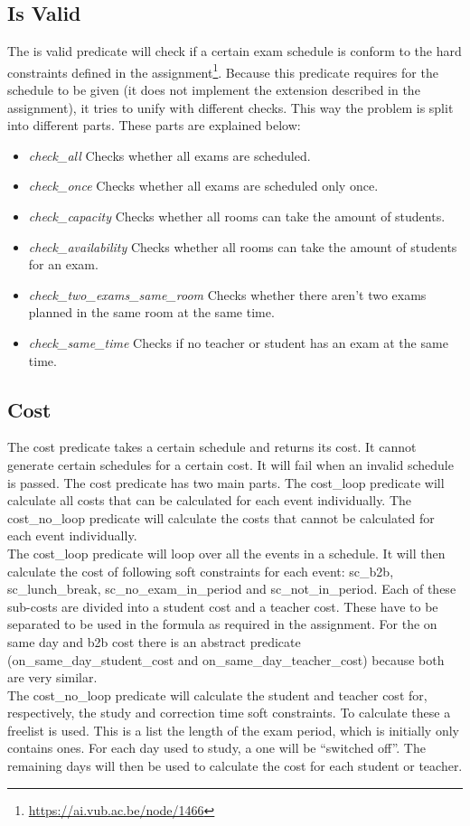 \documentclass[11pt]{article}
\begin{document}
\subsection{Is Valid}
The is valid predicate will check if a certain exam schedule is conform to the hard constraints defined in the assignment\footnote{\url{https://ai.vub.ac.be/node/1466}}. Because this predicate requires for the schedule to be given (it does not implement the extension described in the assignment), it tries to unify with different checks. This way the problem is split into different parts. These parts are explained below:
\begin{itemize}
	\item \emph{check\_all} Checks whether all exams are scheduled.
	\item \emph{check\_once}  Checks whether all exams are scheduled only once.
	\item \emph{check\_capacity}  Checks whether all rooms can take the amount of students.
	\item \emph{check\_availability}  Checks whether all rooms can take the amount of students for an exam.
	\item \emph{check\_two\_exams\_same\_room}  Checks whether there aren't two exams planned in the same room at the same time.
	\item \emph{check\_same\_time} Checks if no teacher or student has an exam at the same time.
\end{itemize}

\subsection{Cost}
The cost predicate takes a certain schedule and returns its cost. It cannot generate certain schedules for a certain cost. It will fail when an invalid schedule is passed. The cost predicate has two main parts. The cost\_loop predicate will calculate all costs that can be calculated for each event individually. The cost\_no\_loop predicate will calculate the costs that cannot be calculated for each event individually. \\
The cost\_loop predicate will loop over all the events in a schedule. It will then calculate the cost of following soft constraints for each event: sc\_b2b, sc\_lunch\_break, sc\_no\_exam\_in\_period and sc\_not\_in\_period. Each of these sub-costs are divided into a student cost and a teacher cost. These have to be separated to be used in the formula as required in the assignment. For the on same day and b2b cost there is an abstract predicate (on\_same\_day\_student\_cost and on\_same\_day\_teacher\_cost) because both are very similar.\\
The cost\_no\_loop predicate will calculate the student and teacher cost for, respectively, the study and correction time soft constraints. To calculate these a freelist is used. This is a list the length of the exam period, which is initially only contains ones. For each day used to study, a one will be ``switched off''. The remaining days will then be used to calculate the cost for each student or teacher.
\end{document}
